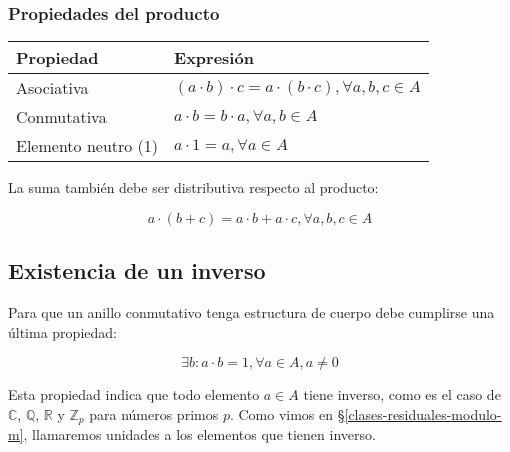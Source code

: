 \subsubsection{Propiedades del producto}

\begin{center}
\begin{tabular}{l l}
	\textbf{Propiedad}  & \textbf{Expresión}                                               \\
	\toprule
	Asociativa          & $(a \cdot b) \cdot c = a \cdot (b \cdot c), \forall a,b,c \in A$ \\
	Conmutativa         & $a \cdot b = b \cdot a, \forall a,b \in A$                       \\
	Elemento neutro (1) & $a \cdot 1 = a, \forall a \in A$                                 \\
\end{tabular}
\end{center}

La suma también debe ser distributiva respecto al producto:

\[a \cdot (b+c) = a \cdot b + a \cdot c, \forall a,b,c \in A\]

\subsection{Existencia de un inverso}

Para que un anillo conmutativo tenga estructura de cuerpo debe cumplirse una última propiedad:

\[\exists b : a \cdot b = 1, \forall a \in A, a \neq 0\]

Esta propiedad indica que todo elemento $a \in A$ tiene inverso, como es el caso de $\mathbb{C}$, $\mathbb{Q}$, $\mathbb{R}$ y $\mathbb{Z}_p$ para números primos $p$.
Como vimos en \S\ref{clases-residuales-modulo-m}, llamaremos unidades a los elementos que tienen inverso.
